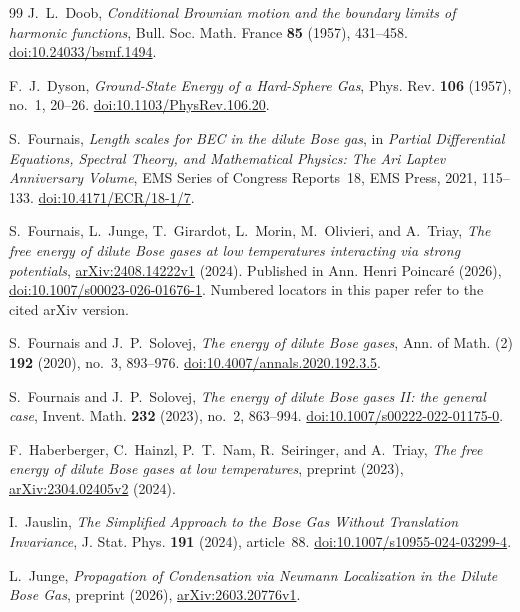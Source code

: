 \begin{thebibliography}{99}
J.~L.~Doob,
\emph{Conditional Brownian motion and the boundary limits of harmonic
functions}, Bull. Soc. Math. France \textbf{85} (1957), 431--458.
\href{https://doi.org/10.24033/bsmf.1494}{doi:10.24033/bsmf.1494}.

F.~J.~Dyson,
\emph{Ground-State Energy of a Hard-Sphere Gas},
Phys. Rev. \textbf{106} (1957), no.~1, 20--26.
\href{https://doi.org/10.1103/PhysRev.106.20}{doi:10.1103/PhysRev.106.20}.

S.~Fournais,
\emph{Length scales for BEC in the dilute Bose gas},
in \emph{Partial Differential Equations, Spectral Theory, and Mathematical Physics:
The Ari Laptev Anniversary Volume}, EMS Series of Congress Reports~18,
EMS Press, 2021, 115--133.
\href{https://doi.org/10.4171/ECR/18-1/7}{doi:10.4171/ECR/18-1/7}.

S.~Fournais, L.~Junge, T.~Girardot, L.~Morin, M.~Olivieri, and A.~Triay,
\emph{The free energy of dilute Bose gases at low temperatures interacting
via strong potentials},
\href{https://arxiv.org/abs/2408.14222v1}{arXiv:2408.14222v1} (2024).
Published in Ann. Henri Poincar\'e (2026),
\href{https://doi.org/10.1007/s00023-026-01676-1}{doi:10.1007/s00023-026-01676-1}.
Numbered locators in this paper refer to the cited arXiv version.

S.~Fournais and J.~P.~Solovej,
\emph{The energy of dilute Bose gases},
Ann. of Math. (2) \textbf{192} (2020), no.~3, 893--976.
\href{https://doi.org/10.4007/annals.2020.192.3.5}{doi:10.4007/annals.2020.192.3.5}.

S.~Fournais and J.~P.~Solovej,
\emph{The energy of dilute Bose gases II: the general case},
Invent. Math. \textbf{232} (2023), no.~2, 863--994.
\href{https://doi.org/10.1007/s00222-022-01175-0}{doi:10.1007/s00222-022-01175-0}.

F.~Haberberger, C.~Hainzl, P.~T.~Nam, R.~Seiringer, and A.~Triay,
\emph{The free energy of dilute Bose gases at low temperatures},
preprint (2023),
\href{https://arxiv.org/abs/2304.02405v2}{arXiv:2304.02405v2} (2024).

I.~Jauslin,
\emph{The Simplified Approach to the Bose Gas Without Translation
Invariance}, J. Stat. Phys. \textbf{191} (2024), article~88.
\href{https://doi.org/10.1007/s10955-024-03299-4}{doi:10.1007/s10955-024-03299-4}.

L.~Junge,
\emph{Propagation of Condensation via Neumann Localization in the
Dilute Bose Gas}, preprint (2026),
\href{https://arxiv.org/abs/2603.20776v1}{arXiv:2603.20776v1}.


\end{thebibliography}
